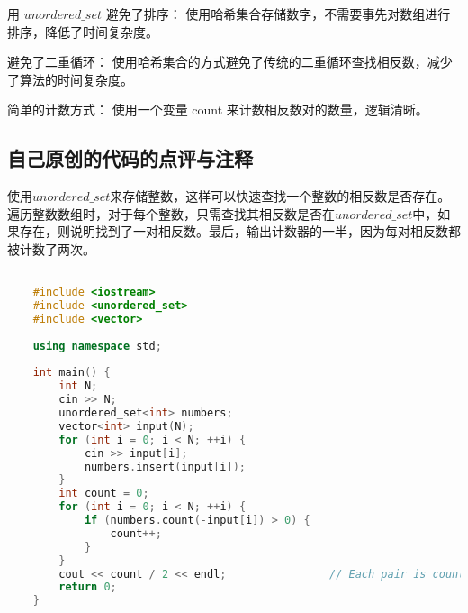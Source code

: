 用 $unordered\_set$ 避免了排序： 使用哈希集合存储数字，不需要事先对数组进行排序，降低了时间复杂度。

避免了二重循环： 使用哈希集合的方式避免了传统的二重循环查找相反数，减少了算法的时间复杂度。

简单的计数方式： 使用一个变量 count 来计数相反数对的数量，逻辑清晰。

\subsection{自己原创的代码的点评与注释}

使用$unordered\_set$来存储整数，这样可以快速查找一个整数的相反数是否存在。遍历整数数组时，对于每个整数，只需查找其相反数是否在$unordered\_set$中，如果存在，则说明找到了一对相反数。最后，输出计数器的一半，因为每对相反数都被计数了两次。

\begin{lstlisting}[language=C++]

    #include <iostream>
    #include <unordered_set>
    #include <vector>
    
    using namespace std;
    
    int main() {
        int N;
        cin >> N;
        unordered_set<int> numbers;
        vector<int> input(N);
        for (int i = 0; i < N; ++i) {
            cin >> input[i];
            numbers.insert(input[i]);
        }
        int count = 0;
        for (int i = 0; i < N; ++i) {
            if (numbers.count(-input[i]) > 0) {
                count++;
            }
        }
        cout << count / 2 << endl;                // Each pair is counted twice (a and -a)
        return 0;
    }
\end{lstlisting}